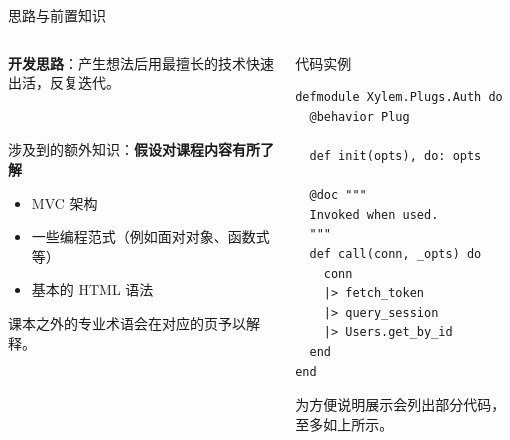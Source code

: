 \documentclass[UTF8]{ctexbeamer}
\begin{document}
\begin{frame}[fragile]{思路与前置知识}\label{Prerequisite}
\begin{columns}
\begin{column}{0.4\textwidth}
\textbf{开发思路}：产生想法后用最擅长的技术快速出活，反复迭代。

~

涉及到的额外知识：\textbf{假设对课程内容有所了解}
\begin{itemize}
  \item MVC 架构
  \item 一些编程范式（例如面对对象、函数式等）
  \item 基本的 HTML 语法
\end{itemize}

课本之外的专业术语会在对应的页予以解释。
\end{column}
\begin{column}{0.55\textwidth}
\begin{block}{代码实例}
\begin{verbatim}
defmodule Xylem.Plugs.Auth do
  @behavior Plug

  def init(opts), do: opts

  @doc """
  Invoked when used.
  """
  def call(conn, _opts) do
    conn
    |> fetch_token
    |> query_session
    |> Users.get_by_id
  end
end
\end{verbatim}
\footnotesize{为方便说明展示会列出部分代码，至多如上所示。}\normalsize  %
\end{block}
\end{column}
\end{columns}
\end{frame}
\end{document}
